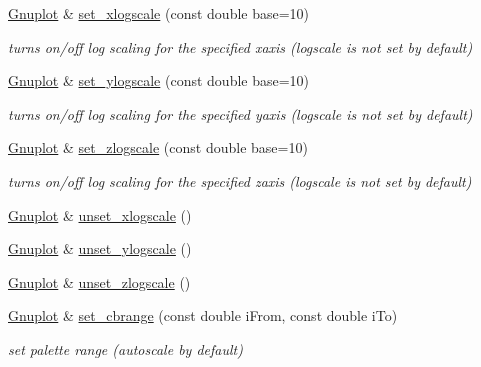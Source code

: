 \begin{DoxyCompactItemize}
\mbox{\label{class_gnuplot_aff546fad227d93babeb5d2cc9f047b89}} 
\hyperlink{class_gnuplot}{Gnuplot} \& \hyperlink{class_gnuplot_aff546fad227d93babeb5d2cc9f047b89}{set\+\_\+xlogscale} (const double base=10)
\begin{DoxyCompactList}\small\item\em turns on/off log scaling for the specified xaxis (logscale is not set by default) \end{DoxyCompactList}\item 
\mbox{\label{class_gnuplot_a201a802d2f27fece0d39809c4eb3bce0}} 
\hyperlink{class_gnuplot}{Gnuplot} \& \hyperlink{class_gnuplot_a201a802d2f27fece0d39809c4eb3bce0}{set\+\_\+ylogscale} (const double base=10)
\begin{DoxyCompactList}\small\item\em turns on/off log scaling for the specified yaxis (logscale is not set by default) \end{DoxyCompactList}\item 
\mbox{\label{class_gnuplot_a1da3838163b0dbde8809b55c5b5c56b1}} 
\hyperlink{class_gnuplot}{Gnuplot} \& \hyperlink{class_gnuplot_a1da3838163b0dbde8809b55c5b5c56b1}{set\+\_\+zlogscale} (const double base=10)
\begin{DoxyCompactList}\small\item\em turns on/off log scaling for the specified zaxis (logscale is not set by default) \end{DoxyCompactList}\item 
\hyperlink{class_gnuplot}{Gnuplot} \& \hyperlink{class_gnuplot_a7b178184260f1498cd0c11a197ea0ac2}{unset\+\_\+xlogscale} ()
\item 
\hyperlink{class_gnuplot}{Gnuplot} \& \hyperlink{class_gnuplot_a9217543dd49c4802b1194d42c5e10b6d}{unset\+\_\+ylogscale} ()
\item 
\hyperlink{class_gnuplot}{Gnuplot} \& \hyperlink{class_gnuplot_afa67f022ca344593b054d7f2e3406c7e}{unset\+\_\+zlogscale} ()
\item 
\mbox{\label{class_gnuplot_a2228f5ab4cce2da463fc90383076a598}} 
\hyperlink{class_gnuplot}{Gnuplot} \& \hyperlink{class_gnuplot_a2228f5ab4cce2da463fc90383076a598}{set\+\_\+cbrange} (const double i\+From, const double i\+To)
\begin{DoxyCompactList}\small\item\em set palette range (autoscale by default) \end{DoxyCompactList}\item 

\end{DoxyCompactItemize}
